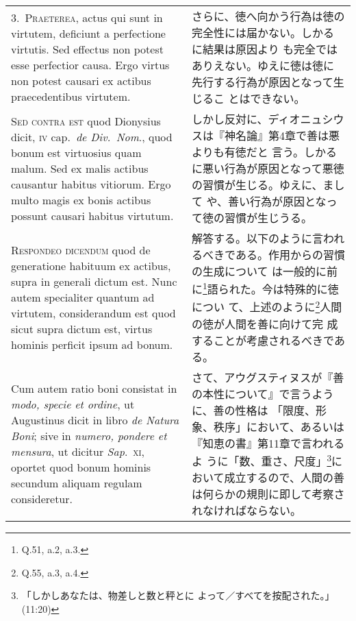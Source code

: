 \documentclass[10pt]{jsarticle}
\begin{document}
\begin{longtable}{p{21em}p{21em}}
\\



3.~{\scshape Praeterea}, actus qui sunt in virtutem, deficiunt a
perfectione virtutis. Sed effectus non potest esse perfectior
causa. Ergo virtus non potest causari ex actibus praecedentibus
virtutem.

&

さらに、徳へ向かう行為は徳の完全性には届かない。しかるに結果は原因より
も完全ではありえない。ゆえに徳は徳に先行する行為が原因となって生じるこ
とはできない。
 
\\



{\scshape Sed contra est} quod Dionysius dicit, {\scshape iv}
cap.~{\itshape de Div.~Nom}., quod bonum est virtuosius quam
malum. Sed ex malis actibus causantur habitus vitiorum. Ergo multo
magis ex bonis actibus possunt causari habitus virtutum.

&

しかし反対に、ディオニュシウスは『神名論』第4章で善は悪よりも有徳だと
言う。しかるに悪い行為が原因となって悪徳の習慣が生じる。ゆえに、まして
や、善い行為が原因となって徳の習慣が生じうる。
 
\\



{\scshape Respondeo dicendum} quod de generatione habituum ex actibus,
supra in generali dictum est. Nunc autem specialiter quantum ad
virtutem, considerandum est quod sicut supra dictum est, virtus
hominis perficit ipsum ad bonum.

&

解答する。以下のように言われるべきである。作用からの習慣の生成について
は一般的に前に\footnote{Q.51, a.2, a.3.}語られた。今は特殊的に徳につい
て、上述のように\footnote{Q.55, a.3, a.4.}人間の徳が人間を善に向けて完
成することが考慮されるべきである。
 
\\


 Cum autem ratio boni consistat in {\itshape modo, specie et ordine},
ut Augustinus dicit in libro {\itshape de Natura Boni}; sive in
{\itshape numero, pondere et mensura}, ut dicitur {\itshape
Sap}.~{\scshape xi}, oportet quod bonum hominis secundum aliquam
regulam consideretur.

&

 さて、アウグスティヌスが『善の本性について』で言うように、善の性格は
 「限度、形象、秩序」において、あるいは『知恵の書』第11章で言われるよ
 うに「数、重さ、尺度」\footnote{「しかしあなたは、物差しと数と秤とに
 よって／すべてを按配された。」(11:20)}において成立するので、人間の善
 は何らかの規則に即して考察されなければならない。


\end{longtable}
\end{document}
